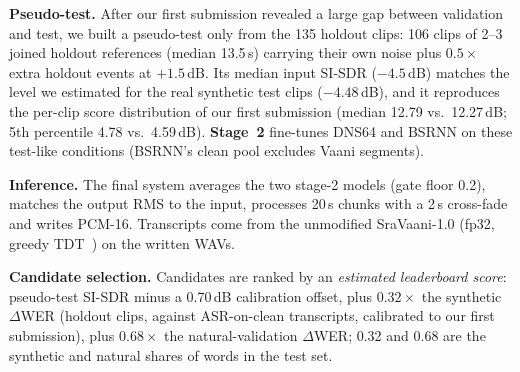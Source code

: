 \documentclass[conference]{IEEEtran}
\begin{document}
\textbf{Pseudo-test.} After our first submission revealed a large gap between validation and test, we built a
pseudo-test only from the 135 holdout clips: 106 clips of 2--3 joined holdout references (median 13.5\,s) carrying
their own noise plus $0.5\times$ extra holdout events at $+1.5$\,dB. Its median input SI-SDR ($-4.5$\,dB) matches the
level we estimated for the real synthetic test clips ($-4.48$\,dB), and it reproduces the per-clip score
distribution of our first submission (median 12.79 vs.\ 12.27\,dB; 5th percentile 4.78 vs.\ 4.59\,dB).
\textbf{Stage~2} fine-tunes DNS64 and BSRNN on these test-like conditions (BSRNN's clean pool excludes Vaani
segments).

\textbf{Inference.} The final system averages the two stage-2 models (gate floor 0.2), matches the output RMS to
the input, processes 20\,s chunks with a 2\,s cross-fade and writes PCM-16. Transcripts come from the unmodified
SraVaani-1.0 (fp32, greedy TDT~\cite{tdt}) on the written WAVs.

\textbf{Candidate selection.} Candidates are ranked by an \emph{estimated leaderboard score}: pseudo-test SI-SDR
minus a 0.70\,dB calibration offset, plus $0.32\times$ the synthetic $\Delta$WER (holdout clips, against
ASR-on-clean transcripts, calibrated to our first submission), plus $0.68\times$ the natural-validation $\Delta$WER;
0.32 and 0.68 are the synthetic and natural shares of words in the test set.
\end{document}
